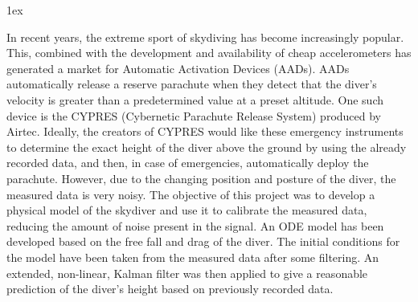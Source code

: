 
\topmargin -0.5in
\footskip 0.7in
\textwidth 6.5in
\textheight 9.0in
\oddsidemargin 0.1in
\evensidemargin 0.1in
\parindent0pt\parskip1ex



%

In recent years, the extreme sport of skydiving has become increasingly popular. This, combined with the development
and availability of cheap accelerometers has generated a market for Automatic Activation Devices (AADs). AADs
automatically release a reserve parachute when they detect that the diver's velocity is greater than a predetermined
value at a preset altitude. One such device is the CYPRES (Cybernetic Parachute Release System) produced by Airtec.
Ideally, the creators of CYPRES would like these emergency instruments to determine the exact height of the diver above the ground by using the already recorded data, and then, in case of emergencies, automatically deploy the parachute. However, due to the changing position and posture of the diver, the measured data
is very noisy. The objective of this project was to develop a physical model of the skydiver and use it to calibrate the measured data, reducing the amount of noise present in the signal. An ODE model has been developed based on the free fall and drag of the diver. The initial conditions for the model have been taken from the measured data after some filtering. An extended, non-linear, Kalman filter was then applied to give a reasonable prediction of the diver's height based on previously recorded data.

%